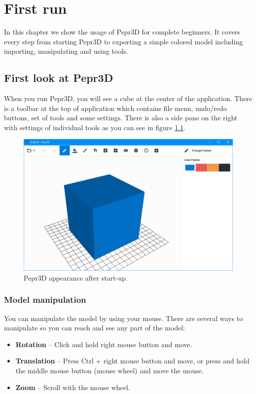 \chapter{First run}

In this chapter we show the usage of Pepr3D for complete beginners. It covers every step from starting Pepr3D to exporting a simple colored model including importing, manipulating and using tools.


\section{First look at Pepr3D}

When you run Pepr3D, you will see a cube at the center of the application. There is a toolbar at the top of application which contains file menu, undo/redo buttons, set of tools and some settings. There is also a side pane on the right with settings of individual tools as you can see in figure \ref{fig:pepr_cube}.

\begin{figure}
	\centering
	\includegraphics[scale=0.5]{images/pepr_cube.png}
	\caption{Pepr3D appearance after start-up.}
	\label{fig:pepr_cube}
\end{figure}

\subsection{Model manipulation}
You can manipulate the model by using your mouse. There are several ways to manipulate so you can reach and see any part of the model:

\begin{itemize}
\item \textbf{Rotation} -- Click and hold right mouse button and move.
\item \textbf{Translation} -- Press Ctrl + right mouse button and move, or press and hold the middle mouse button (mouse wheel) and move the mouse.
\item \textbf{Zoom} -- Scroll with the mouse wheel.
\end{itemize}

